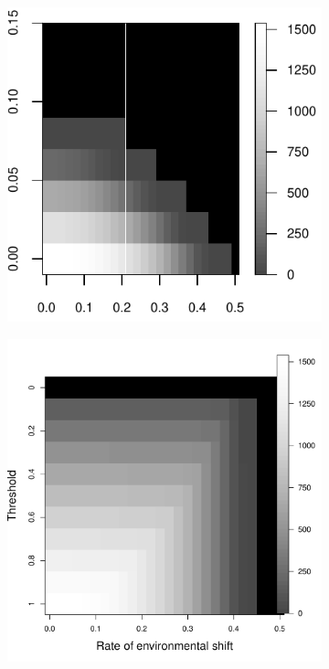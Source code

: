 \documentclass[12pt,english]{article}
\begin{document}
\begin{spacing}{1.9}
\begin{figure}[htbp]
\begin{subfigure}{.33\textwidth}
\subcaption{}
\includegraphics[width=\textwidth]{plots/eqbiomass_sim.pdf}
\label{nomang}
\end{subfigure}
\begin{subfigure}{.33\textwidth}
\subcaption{}
\includegraphics[width=\textwidth]{plots/eqbiomass_thresh.pdf}

\end{subfigure}
\end{figure}
\end{spacing}
\end{document}
